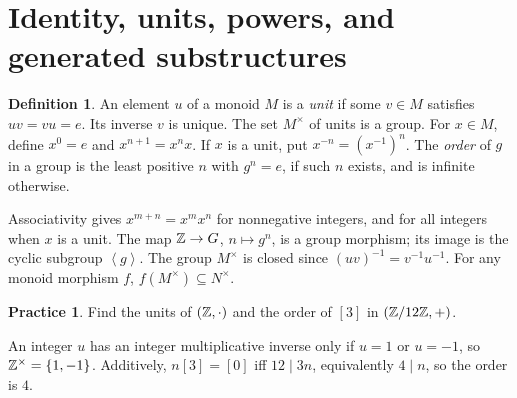 \documentclass[11pt,openany]{book}
\newcommand{\angles}[1]{\left\langle#1\right\rangle}
\theoremstyle{definition}
\newtheorem{definition}[theorem]{Definition}
\newtheorem{exercise}[theorem]{Practice}
\begin{document}
\section{Identity, units, powers, and generated substructures}
\begin{definition}An element $u$ of a monoid $M$ is a \emph{unit} if some $v\in M$ satisfies $uv=vu=e$. Its inverse $v$ is unique. The set $M^\times$ of units is a group. For $x\in M$, define $x^0=e$ and $x^{n+1}=x^nx$. If $x$ is a unit, put $x^{-n}=(x^{-1})^n$. The \emph{order} of $g$ in a group is the least positive $n$ with $g^n=e$, if such $n$ exists, and is infinite otherwise.\end{definition}
Associativity gives $x^{m+n}=x^mx^n$ for nonnegative integers, and for all integers when $x$ is a unit. The map $\mathbb Z\to G$, $n\mapsto g^n$, is a group morphism; its image is the cyclic subgroup $\angles g$. The group $M^\times$ is closed since $(uv)^{-1}=v^{-1}u^{-1}$. For any monoid morphism $f$, $f(M^\times)\subseteq N^\times$.
\begin{exercise}Find the units of $(\mathbb Z,\cdot)$ and the order of $[3]$ in $(\mathbb Z/12\mathbb Z,+)$.\end{exercise}
\begin{solution}An integer $u$ has an integer multiplicative inverse only if $u=1$ or $u=-1$, so $\mathbb Z^\times=\{1,-1\}$. Additively, $n[3]=[0]$ iff $12\mid3n$, equivalently $4\mid n$, so the order is $4$.\end{solution}
\end{document}
